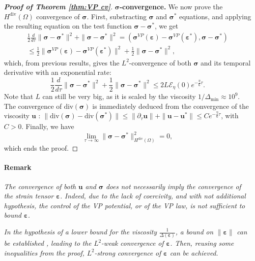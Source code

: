 \documentclass[11pt]{article}
\newcommand{\bu}{\mathbf{u}}
\newcommand{\sig}{\boldsymbol{\sigma}}
\newcommand{\beps}{\boldsymbol{\varepsilon}}
\begin{document}
\begin{proof}[\textbf{Proof of Theorem \ref{thm:VP cv}}]
\noindent \textbf{$\sig$-convergence.} We now prove the $H^{\operatorname{div}}(\Omega)$ convergence of $\sig$. First, substracting $\sig$ and $\sig^*$ equations, and applying the resulting equation on the test function $\sig-\sig^*$, we get
\begin{multline*}
\frac12 \frac{d}{d\tau} \|\sig-\sig^*\|^2 + \|\sig-\sig^*\|^2 = (\sig^{VP}(\beps)-\sig^{VP}(\beps^*), \sig-\sig^*)
\\
\leq \frac{1}{2}\|\sig^{VP}(\beps)-\sig^{VP}(\beps^*)\|^2+\frac{1}{2}\|\sig-\sig^*\|^2,
\end{multline*}
which, from previous results, gives the $L^2$-convergence of both $\sig$ and its temporal derivative with an exponential rate:
$$
\frac12 \frac{d}{d\tau} \|\sig-\sig^*\|^2 + \frac{1}{2}\|\sig-\sig^*\|^2 \leq 2L\mathcal{E}_\eta (0)e^{-\frac{\eta}{6}  \tau}.
$$ Note that $L$ can still be very big, as it is scaled by the viscosity $1/\Delta_{\min} \approx 10^9$.
The convergence of $\text{div}(\sig)$ is immediately deduced from the convergence of the viscosity $\bu$ : $\|\text{div}(\sig)-\text{div}(\sig^*)\| \leq \|\partial_\tau \bu\| + \|\bu-\bu^*\|\leq C e^{-\frac{\eta}{6}  \tau } $, with $C > 0$. Finally, we have 
$$\underset{\tau \rightarrow\infty}{\lim }\|\sig-\sig^*\|^2_{H^{\operatorname{div}}(\Omega)} =0,
$$which ends the proof.
\end{proof}

\paragraph{Remark} \textit{The convergence of both $\bu$ and $\sig$ does not necessarily imply the convergence of the strain tensor $\beps$. Indeed, due to the lack of coercivity, and with not additional hypothesis, the control of the VP potential, or of the VP law, is not sufficient to bound $\beps$.}

\textit{In the hypothesis of a lower bound for the viscosity $\frac{1}{\Delta(\beps)}$, a bound on $\|\beps\|$ can be established \cite{Mehlmann2021}, leading to the $L^2$-weak convergence of $\beps$. Then, reusing some inequalities from the proof, $L^2$-strong convergence of $\beps$ can be achieved.}
\end{document}

